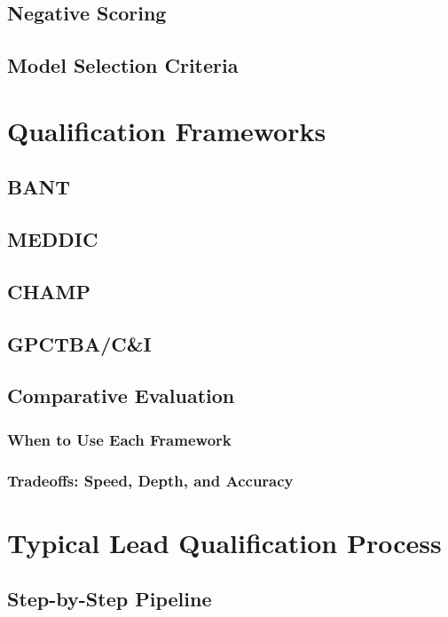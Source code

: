     \subsection{Negative Scoring}\mbox{}
    \subsection{Model Selection Criteria}\mbox{}

\section{Qualification Frameworks}\mbox{}
    \subsection{BANT}\mbox{}
    \subsection{MEDDIC}\mbox{}
    \subsection{CHAMP}\mbox{}
    \subsection{GPCTBA/C\&I}\mbox{}
    \subsection{Comparative Evaluation}\mbox{}
        \subsubsection{When to Use Each Framework}\mbox{}
        \subsubsection{Tradeoffs: Speed, Depth, and Accuracy}\mbox{}

\section{Typical Lead Qualification Process}\mbox{}
    \subsection{Step-by-Step Pipeline}\mbox{}
